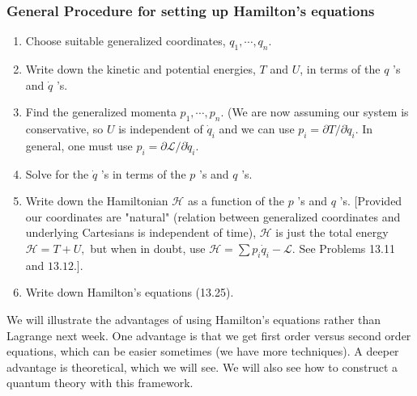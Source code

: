 \subsubsection{General Procedure for setting up Hamilton's equations}
\begin{enumerate}[1.]
\item Choose suitable generalized coordinates, $q_{1}, \cdots, q_{n}$.
\item Write down the kinetic and potential energies, $T$ and $U$, in terms of the $q$ 's and $\dot{q}$ 's. 
\item Find the generalized momenta $p_{1}, \cdots, p_{n} .$ (We are now assuming our system is conservative, so $U$ is independent of $\dot{q}_{i}$ and we can use $p_{i}=\partial T / \partial \dot{q}_{i} .$ In general, one must use $p_{i}=\partial \mathcal{L} / \partial \dot{q}_{i}$. 
\item Solve for the $\dot{q}$ 's in terms of the $p$ 's and $q$ 's.
\item Write down the Hamiltonian $\mathcal{H}$ as a function of the $p$ 's and $q$ 's. [Provided our coordinates are "natural" (relation between generalized coordinates and underlying Cartesians is independent of time), $\mathcal{H}$ is just the total energy $\mathcal{H}=T+U,$ but when in doubt, use $\mathcal{H}=\sum p_{i} \dot{q}_{i}-\mathcal{L} .$ See Problems 13.11
and $13.12 .]$.
\item Write down Hamilton's equations (13.25).
\end{enumerate}
We will illustrate the advantages of using Hamilton's equations rather than Lagrange next week. One advantage is that we get first order versus second order equations, which can be easier sometimes (we have more techniques). A deeper advantage is theoretical, which we will see. We will also see how to construct a quantum theory with this framework.